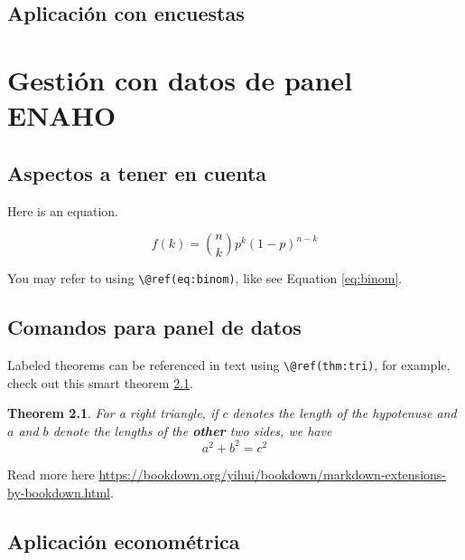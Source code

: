 \documentclass[
]{book}
\newtheorem{theorem}{Theorem}[chapter]
\theoremstyle{definition}
\theoremstyle{definition}
\theoremstyle{definition}
\theoremstyle{definition}
\theoremstyle{remark}
\begin{document}
\hypertarget{aplicaciuxf3n-con-encuestas}{%
\section{Aplicación con encuestas}\label{aplicaciuxf3n-con-encuestas}}

\hypertarget{gestiuxf3n-con-datos-de-panel-enaho}{%
\chapter{Gestión con datos de panel ENAHO}\label{gestiuxf3n-con-datos-de-panel-enaho}}

\hypertarget{aspectos-a-tener-en-cuenta}{%
\section{Aspectos a tener en cuenta}\label{aspectos-a-tener-en-cuenta}}

Here is an equation.

\begin{equation} 
  f\left(k\right) = \binom{n}{k} p^k\left(1-p\right)^{n-k}
  \label{eq:binom}
\end{equation}

You may refer to using \texttt{\textbackslash{}@ref(eq:binom)}, like see Equation \eqref{eq:binom}.

\hypertarget{comandos-para-panel-de-datos}{%
\section{Comandos para panel de datos}\label{comandos-para-panel-de-datos}}

Labeled theorems can be referenced in text using \texttt{\textbackslash{}@ref(thm:tri)}, for example, check out this smart theorem \ref{thm:tri}.

\begin{theorem}
\protect\hypertarget{thm:tri}{}\label{thm:tri}For a right triangle, if \(c\) denotes the \emph{length} of the hypotenuse
and \(a\) and \(b\) denote the lengths of the \textbf{other} two sides, we have
\[a^2 + b^2 = c^2\]
\end{theorem}

Read more here \url{https://bookdown.org/yihui/bookdown/markdown-extensions-by-bookdown.html}.

\hypertarget{aplicaciuxf3n-economuxe9trica}{%
\section{Aplicación econométrica}\label{aplicaciuxf3n-economuxe9trica}}
\end{document}
